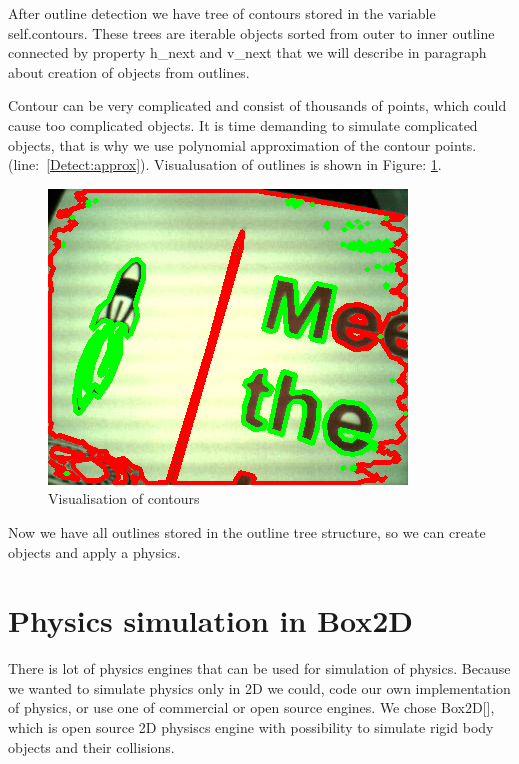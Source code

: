 \documentclass{ifacconf}
\begin{document}
After outline detection we have tree of contours stored in the variable
self.contours. These trees are iterable objects sorted from outer to inner
outline connected by property h\_next and v\_next that we will describe in
paragraph about creation of objects from outlines.

Contour can be very complicated and consist of thousands of points, which could
cause too complicated objects. It is time demanding to simulate complicated
objects, that is why we use polynomial approximation of the contour points.
(line:~\ref{Detect:approx}). Visualusation of outlines is shown in Figure:
\ref{fig:contours}.

\begin{figure}[h]
\includegraphics[width=\columnwidth]{images/5test-contours.png}
\caption{Visualisation of contours}
\label{fig:contours}
\end{figure}

Now we have all outlines stored in the outline tree structure, so we can create
objects and apply a physics.

\section{Physics simulation in Box2D}
There is lot of physics engines that can be used for simulation of physics.
Because we wanted to simulate physics only in 2D we could, code our own
implementation of physics, or use one of commercial or open source engines. We
chose Box2D[\cite{GameEngines}], which is open source 2D physiscs engine with
possibility to simulate rigid body objects and their collisions.
\end{document}
